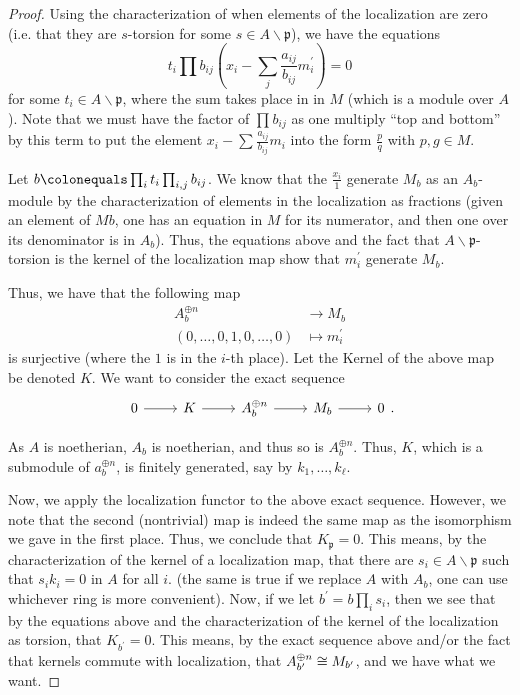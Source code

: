 \begin{proof}
	Using the characterization of when elements of the localization 
	are zero (i.e. that they are \(s\)-torsion for some 
	\(s \in A \smallsetminus \mathfrak{p} \)),
	we have the equations
	\[
	t_{i}\prod_{}^{} b_{ij}
	\left(x_{i} - \sum_{j}^{} \frac{a_{ij}}{b_{ij}} m^{\prime}_{i}  \right)
	= 0
	\] 
	for some \(t_{i} \in A \smallsetminus \mathfrak{p}\),
	where the sum takes place in
	in \(M\) (which is a module over \(A\)).
	Note that we must have the factor of \(\prod_{}^{} b_{ij} \) as
	one multiply ``top and bottom'' by this term
	to put the element \(x_{i} - \sum_{}^{} \frac{a_{ij}}{b_{ij}}m_{i} \) 
	into the form \(\frac{p}{q}\) with \(p,g \in M\).

	Let \(b \colonequals \prod_{i}^{} t_{i}  \prod_{i,j}^{} b_{ij}\). 
	We know that the \(\frac{x_{i}}{1}\) generate \(M_{b}\) as an
	\(A_{b}\)-module by the characterization of elements in the localization
	as fractions (given an element of \(M {b}\), one has an equation
	in \(M\) for its numerator, and then one over its denominator 
	is in \(A_{b}\)).
	Thus, the equations above and the fact that 
	\(A \smallsetminus \mathfrak{p}\)-torsion is the 
	kernel of the localization map show that
	\(m_{i}^{\prime}\) generate \(M_{b}\). 

	Thus, we have that the following map
	\begin{align*}
		A_{b}^{\oplus n} &\longrightarrow M_{b} \\
		(0,\ldots,0,1,0,\ldots,0) &\longmapsto m_{i}^{\prime}
	\end{align*}
	is surjective (where the \(1\) is in the \(i\)-th place).
	Let the Kernel of the above map be denoted \(K\).
	We want to consider the exact sequence
	\[
	\begin{tikzcd}
	0 \arrow{r}{} & K \arrow{r}{} & 
	A_{b}^{\oplus n} \arrow{r}{} & M_{b} \arrow{r}{} & 0
	\end{tikzcd}
	.\]
	
	As \(A\) is noetherian, \(A_{b}\) is noetherian,
	and thus so is \(A_{b}^{\oplus n}\).
	Thus, \(K\), which is a submodule of \(a_{b}^{\oplus n}\),
	is finitely generated, say by 
	\(k_{1}, \ldots, k_{\ell}\).
	
	Now, we apply the localization functor to the above
	exact sequence. 
	However, we note that the second (nontrivial) map
	is indeed the same map as the isomorphism we
	gave in the first place.
	Thus, we conclude that \(K_{\mathfrak{p}} = 0\).
	This means, by the characterization
	of the kernel of a localization map,
	that there are \(s_{i} \in A \smallsetminus \mathfrak{p}\) 
	such that \(s_{i}k_{i} = 0\) in \(A\) for all \(i\).
	(the same is true if we replace  \(A\) with \(A_{b}\),
	one can use whichever ring is more convenient).
	Now, if we let 
	\(b^{\prime} = b \prod_{i}^{} s_{i} \),
	then we see that by the equations above
	and the characterization of the kernel of the localization
	as torsion, that
	\(K_{b^{\prime}} = 0\).
	This means, by the exact sequence above and/or the fact
	that kernels commute with localization,
	that \(A_{b^{\prime}}^{\oplus n} \cong M_{b^{\prime}}\),
	and we have what we want.
	
\end{proof}


